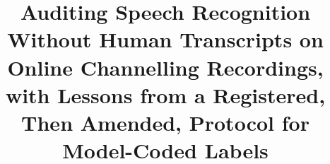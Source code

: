 
\title{Auditing Speech Recognition Without Human Transcripts on Online Channelling Recordings, with Lessons from a Registered, Then Amended, Protocol for Model-Coded Labels}
